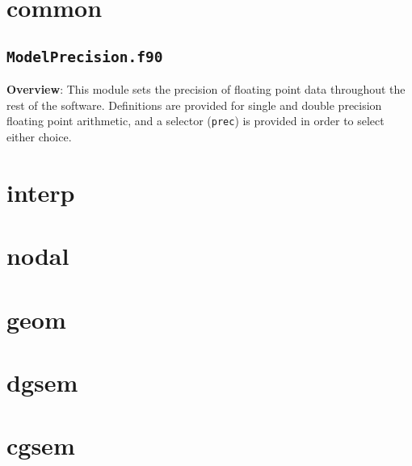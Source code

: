 \documentclass[12pt]{softwaremanual}
\begin{document}
\section{common}
\subsection{\texttt{ModelPrecision.f90}}
 \textbf{Overview}:
    This module sets the precision of floating point data throughout the rest of the software. Definitions are provided for single and double precision floating point arithmetic, and a selector (\texttt{prec}) is provided in order to select either choice.
\section{interp}
\section{nodal}
\section{geom}
\section{dgsem}
\section{cgsem}
\end{document}
